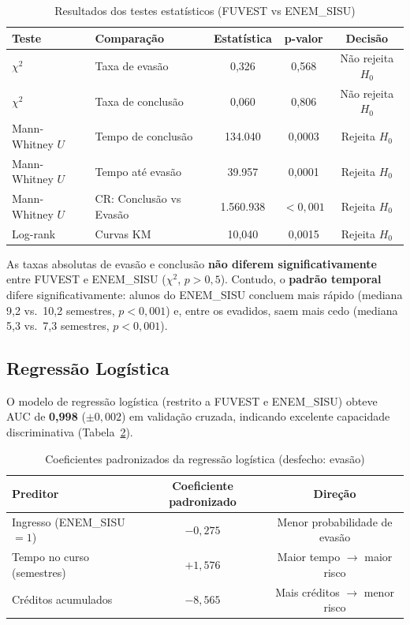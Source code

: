 \documentclass[12pt, a4paper]{article}
\begin{document}
\begin{table}[H]
\centering
\caption{Resultados dos testes estatísticos (FUVEST vs ENEM\_SISU)}
\label{tab:testes}
\begin{tabular}{@{}llccc@{}}
\toprule
\textbf{Teste} & \textbf{Comparação} & \textbf{Estatística} & \textbf{p-valor} & \textbf{Decisão} \\
\midrule
$\chi^2$ & Taxa de evasão    & 0,326  & 0,568 & Não rejeita $H_0$ \\
$\chi^2$ & Taxa de conclusão & 0,060  & 0,806 & Não rejeita $H_0$ \\
Mann-Whitney $U$ & Tempo de conclusão & 134.040 & 0,0003 & Rejeita $H_0$ \\
Mann-Whitney $U$ & Tempo até evasão   & 39.957  & 0,0001 & Rejeita $H_0$ \\
Mann-Whitney $U$ & CR: Conclusão vs Evasão & 1.560.938 & $<0{,}001$ & Rejeita $H_0$ \\
Log-rank         & Curvas KM          & 10,040  & 0,0015 & Rejeita $H_0$ \\
\bottomrule
\end{tabular}
\end{table}

As taxas absolutas de evasão e conclusão \textbf{não diferem
significativamente} entre FUVEST e ENEM\_SISU ($\chi^2$, $p > 0{,}5$).
Contudo, o \textbf{padrão temporal} difere significativamente: alunos do
ENEM\_SISU concluem mais rápido (mediana 9,2 vs.\ 10,2 semestres,
$p < 0{,}001$) e, entre os evadidos, saem mais cedo (mediana 5,3 vs.\
7,3 semestres, $p < 0{,}001$).

\subsection{Regressão Logística}

O modelo de regressão logística (restrito a FUVEST e ENEM\_SISU) obteve
AUC de \textbf{0,998} ($\pm 0{,}002$) em validação cruzada, indicando
excelente capacidade discriminativa (Tabela~\ref{tab:regressao}).

\begin{table}[H]
\centering
\caption{Coeficientes padronizados da regressão logística (desfecho: evasão)}
\label{tab:regressao}
\begin{tabular}{@{}lcc@{}}
\toprule
\textbf{Preditor} & \textbf{Coeficiente padronizado} & \textbf{Direção} \\
\midrule
Ingresso (ENEM\_SISU $= 1$) & $-0{,}275$ & Menor probabilidade de evasão \\
Tempo no curso (semestres)  & $+1{,}576$ & Maior tempo $\to$ maior risco \\
Créditos acumulados         & $-8{,}565$ & Mais créditos $\to$ menor risco \\
\bottomrule
\end{tabular}
\end{table}
\end{document}
